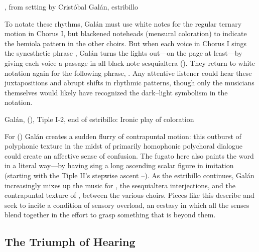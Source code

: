 
{, from setting by Cristóbal Galán, estribillo}

To notate these rhythms, Galán must use white notes for the regular ternary
motion in Chorus I, but blackened noteheads (mensural coloration) to indicate
the hemiola pattern in the other choirs.
But when each voice in Chorus I sings the synesthetic phrase , Galán turns the lights out---on the page at least---by
giving each voice a passage in all black-note sesquialtera
().
They return to white notation again for the following phrase, .
Any attentive listener could hear these juxtapositions and abrupt shifts in
rhythmic patterns, though only the musicians themselves would likely have
recognized the dark--light symbolism in the notation.%
    \Autocite[36]{Kendrick:Jeremiah}

{Galán,  (), Tiple I-2,
end of estribillo: Ironic play of coloration}

For  () Galán creates a
sudden flurry of contrapuntal motion: this outburst of polyphonic texture in
the midst of primarily homophonic polychoral dialogue could create an affective
sense of confusion.
The fugato here also paints the word  in a literal way---by
having  sing a long ascending scalar figure in imitation
(starting with the Tiple II's stepwise ascent --).
As the estribillo continues, Galán increasingly mixes up the music for
, the sesquialtera interjections, and the contrapuntal
texture of , between the various choirs.
Pieces like this describe and seek to incite a condition of sensory overload, an
ecstasy in which all the senses blend together in the effort to grasp something
that is beyond them.

\subsection{The Triumph of Hearing}

